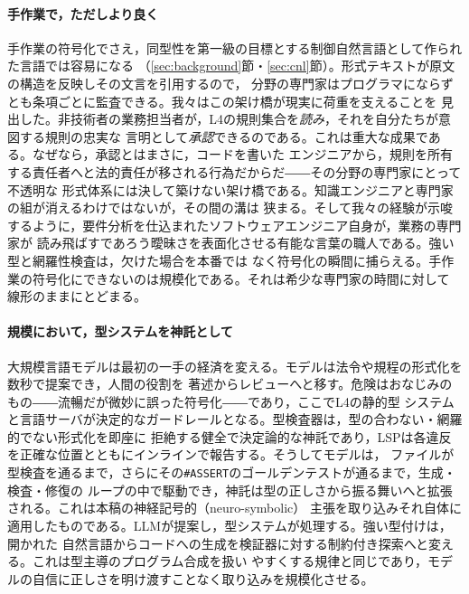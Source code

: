\documentclass[11pt,a4paper]{ltjsarticle}
\newcommand{\code}[1]{\texttt{\small #1}}
\begin{document}
\paragraph{手作業で，ただしより良く}
手作業の符号化でさえ，同型性を第一級の目標とする制御自然言語として作られた言語では容易になる
（\ref{sec:background}節・\ref{sec:cnl}節）。形式テキストが原文の構造を反映しその文言を引用するので，
分野の専門家はプログラマにならずとも条項ごとに監査できる。我々はこの架け橋が現実に荷重を支えることを
見出した。非技術者の業務担当者が，L4の規則集合を\emph{読み}，それを自分たちが意図する規則の忠実な
言明として\emph{承認}できるのである。これは重大な成果である。なぜなら，承認とはまさに，コードを書いた
エンジニアから，規則を所有する責任者へと法的責任が移される行為だからだ――その分野の専門家にとって不透明な
形式体系には決して築けない架け橋である。知識エンジニアと専門家の組が消えるわけではないが，その間の溝は
狭まる。そして我々の経験が示唆するように，要件分析を仕込まれたソフトウェアエンジニア自身が，業務の専門家が
読み飛ばすであろう曖昧さを表面化させる有能な言葉の職人である。強い型と網羅性検査は，欠けた場合を本番では
なく符号化の瞬間に捕らえる。手作業の符号化にできないのは規模化である。それは希少な専門家の時間に対して
線形のままにとどまる。

\paragraph{規模において，型システムを神託として}
大規模言語モデルは最初の一手の経済を変える。モデルは法令や規程の形式化を数秒で提案でき，人間の役割を
著述からレビューへと移す。危険はおなじみのもの――流暢だが微妙に誤った符号化――であり，ここでL4の静的型
システムと言語サーバが決定的なガードレールとなる。型検査器は，型の合わない・網羅的でない形式化を即座に
拒絶する健全で決定論的な神託であり，LSPは各違反を正確な位置とともにインラインで報告する。そうしてモデルは，
ファイルが型検査を通るまで，さらにその\code{\#ASSERT}のゴールデンテストが通るまで，生成・検査・修復の
ループの中で駆動でき，神託は型の正しさから振る舞いへと拡張される。これは本稿の神経記号的（neuro-symbolic）
主張を取り込みそれ自体に適用したものである。LLMが提案し，型システムが処理する。強い型付けは，開かれた
自然言語からコードへの生成を検証器に対する制約付き探索へと変える。これは型主導のプログラム合成を扱い
やすくする規律と同じであり，モデルの自信に正しさを明け渡すことなく取り込みを規模化させる。
\end{document}
